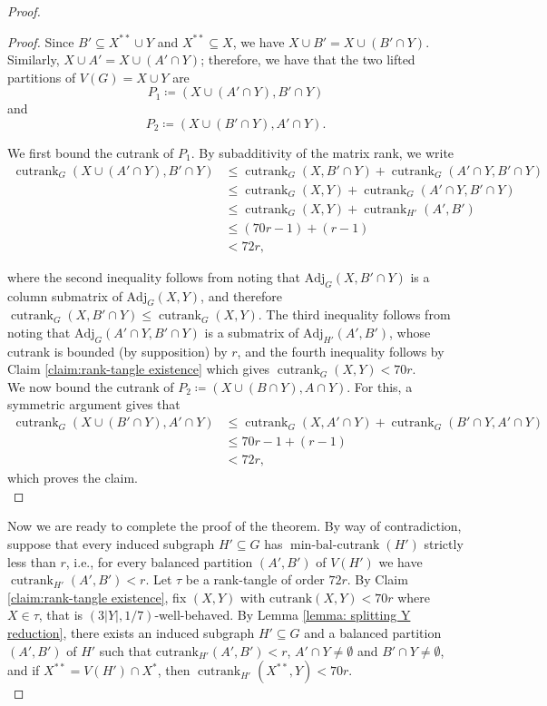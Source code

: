 \documentclass{article}
\theoremstyle{definition}
\begin{document}
\begin{proof}
\begin{proof}
\noindent Since $B'\subseteq X^{**} \cup Y$ and $X^{**} \subseteq X$, we have $X \cup B' = X \cup (B' \cap Y)$. Similarly, $X \cup A' = X \cup (A' \cap Y)$; therefore,  we have that the two lifted partitions of $V(G)=X\cup Y$ are \[P_1\coloneqq (X\cup (A'\cap Y), B'\cap Y)\] and \[P_2\coloneqq (X\cup (B'\cap Y), A'\cap Y).\] 

We first bound the cutrank of $P_1$. By subadditivity of the matrix rank, we write
\begin{align*}
    \operatorname{cutrank}_G(X\cup (A'\cap Y), B'\cap Y) &\leq \operatorname{cutrank}_G(X, B'\cap Y) + \operatorname{cutrank}_G(A'\cap Y, B'\cap Y) \\
    &\leq \operatorname{cutrank}_G(X, Y) + \operatorname{cutrank}_G(A'\cap Y, B'\cap Y) \\
    &\leq \operatorname{cutrank}_G(X,Y) + \operatorname{cutrank}_{H'}(A',B') \\
    &\leq (70r - 1) + (r-1) \\
    &< 72r,
\end{align*}

where the second inequality follows from noting that $\mathrm{Adj}_G(X, B'\cap Y)$ is a column submatrix of $\mathrm{Adj}_G(X,Y)$, and therefore $\operatorname{cutrank}_G(X,B'\cap Y) \leq \operatorname{cutrank}_G(X, Y)$. The third inequality follows from noting that $\mathrm{Adj}_G(A'\cap Y, B'\cap Y)$ is a submatrix of $\mathrm{Adj}_{H'}(A', B')$, whose cutrank is bounded (by supposition) by $r$, and the fourth inequality follows by Claim \ref{claim:rank-tangle existence} which gives $\operatorname{cutrank}_G(X, Y) < 70r$.\\

We now bound the cutrank of $P_2 \coloneqq (X\cup (B\cap Y), A\cap Y)$. For this, a symmetric argument gives that 
\begin{align*}
    \operatorname{cutrank}_G(X\cup (B'\cap Y), A'\cap Y) &\leq \operatorname{cutrank}_G(X, A'\cap Y) + \operatorname{cutrank}_G(B'\cap Y, A'\cap Y) \\
    &\leq 70r - 1 + (r-1) \\
    &< 72r, 
\end{align*}
which proves the claim.\qedhere\\
\end{proof}

Now we are ready to complete the proof of the theorem. By way of contradiction, suppose that every induced subgraph $H' \subseteq G$ has $\operatorname{min-bal-cutrank}(H')$ strictly less than $r$, i.e., for every balanced partition $(A', B')$ of $V(H')$ we have $\operatorname{cutrank}_{H'}(A', B') < r$. Let $\tau$ be a rank-tangle of order $72r$. By Claim \ref{claim:rank-tangle existence}, fix $(X,Y)$ with $\mathrm{cutrank}(X,Y)<70r$ where $X\in\tau$, that is $(3|Y|,1/7)$-well-behaved. By Lemma \ref{lemma: splitting Y reduction}, there exists an induced subgraph $H'\subseteq G$ and a balanced partition $(A', B')$ of $H'$ such that $\mathrm{cutrank}_{H'}(A',B')<r$, $A'\cap Y \neq \emptyset$ and $B'\cap Y\neq \emptyset$, and if $X^{**} = V(H')\cap X^*$, then $\operatorname{cutrank}_{H'}(X^{**}, Y) < 70r$. \\


\end{proof}
\end{document}
